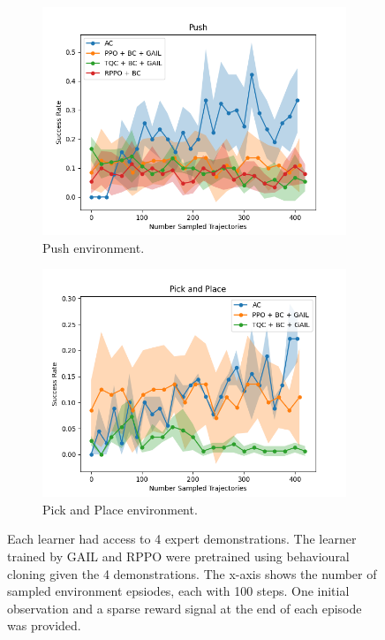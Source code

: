 \begin{figure}[htbp]
\begin{subfigure}[b]{0.45\textwidth}
      \includegraphics[width=\textwidth]{images/4_400/Push.png}
      \caption{Push environment.}
      \label{fig:plot3}
    \end{subfigure}
    \hfill
    \begin{subfigure}[b]{0.45\textwidth}
      \includegraphics[width=\textwidth]{images/4_400/Pick and Place.png}
      \caption{Pick and Place environment.}
      \label{fig:plot4}
    \end{subfigure}
    \caption{Each learner had access to 4 expert demonstrations. 
    The learner trained by GAIL and RPPO were pretrained using behavioural cloning given the 4 demonstrations. 
    The x-axis shows the number of sampled environment epsiodes, each with 100 steps. One initial observation and a sparse reward signal at the end of each episode was provided.}
    \label{fig:4}
\end{figure}

